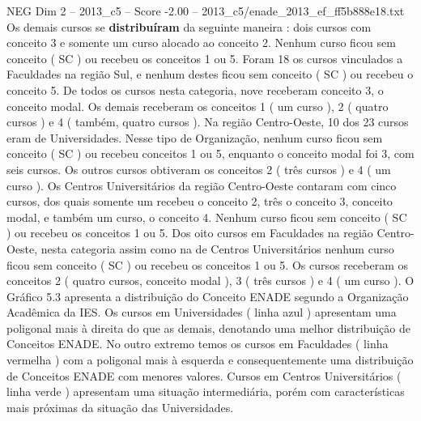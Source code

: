 \begin{textsample}{NEG Dim 2 – 2013\_c5 – Score -2.00 – 2013\_c5/enade\_2013\_ef\_ff5b888e18.txt}
Os demais cursos se \textbf{distribuíram} da seguinte maneira : dois cursos com conceito 3 e somente um curso alocado ao conceito 2.
Nenhum curso ficou sem conceito ( SC ) ou recebeu os conceitos 1 ou 5.
Foram 18 os cursos vinculados a Faculdades na região Sul, e nenhum destes ficou sem conceito ( SC ) ou recebeu o conceito 5.
De todos os cursos nesta categoria, nove receberam conceito 3, o conceito modal.
Os demais receberam os conceitos 1 ( um curso ), 2 ( quatro cursos ) e 4 ( também, quatro cursos ).
Na região Centro-Oeste, 10 dos 23 cursos eram de Universidades.
Nesse tipo de Organização, nenhum curso ficou sem conceito ( SC ) ou recebeu conceitos 1 ou 5, enquanto o conceito modal foi 3, com seis cursos.
Os outros cursos obtiveram os conceitos 2 ( três cursos ) e 4 ( um curso ).
Os Centros Universitários da região Centro-Oeste contaram com cinco cursos, dos quais somente um recebeu o conceito 2, três o conceito 3, conceito modal, e também um curso, o conceito 4.
Nenhum curso ficou sem conceito ( SC ) ou recebeu os conceitos 1 ou 5.
Dos oito cursos em Faculdades na região Centro-Oeste, nesta categoria assim como na de Centros Universitários nenhum curso ficou sem conceito ( SC ) ou recebeu os conceitos 1 ou 5.
Os cursos receberam os conceitos 2 ( quatro cursos, conceito modal ), 3 ( três cursos ) e 4 ( um curso ).
O Gráfico 5.3 apresenta a distribuição do Conceito ENADE segundo a Organização Acadêmica da IES.
Os cursos em Universidades ( linha azul ) apresentam uma poligonal mais à direita do que as demais, denotando uma melhor distribuição de Conceitos ENADE.
No outro extremo temos os cursos em Faculdades ( linha vermelha ) com a poligonal mais à esquerda e consequentemente uma distribuição de Conceitos ENADE com menores valores.
Cursos em Centros Universitários ( linha verde ) apresentam uma situação intermediária, porém com características mais próximas da situação das Universidades.

\end{textsample}
